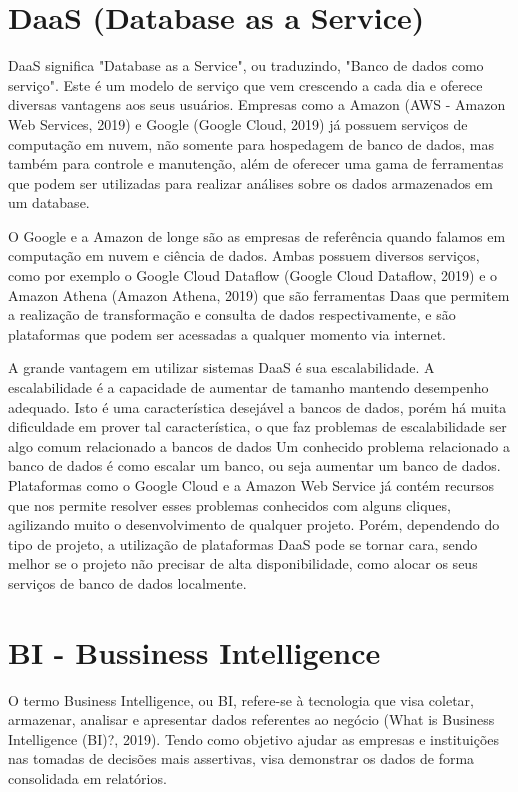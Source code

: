 \documentclass[
	12pt,				%
	openright,			%
	oneside,			%
	a4paper,			%
	chapter=TITLE,		%
	section=TITLE,		%
	subsection=TITLE,	%
	subsubsection=TITLE,%
	english,			%
	brazil				%
	]{abntex2}
\theoremstyle{definition}
\begin{document}
\section{DaaS (Database as a Service)}
    
    DaaS significa "Database as a Service", ou traduzindo, "Banco de dados como serviço". Este é um modelo de serviço que vem crescendo a cada dia e oferece diversas vantagens aos seus usuários. Empresas como a Amazon (AWS - Amazon Web Services, 2019) e Google (Google Cloud, 2019) já possuem serviços de computação em nuvem, não somente para hospedagem de banco de dados, mas também para controle e manutenção, além de oferecer uma gama de ferramentas que podem ser utilizadas para realizar análises sobre os dados armazenados em um database.

    O Google e a Amazon de longe são as empresas de referência quando falamos em computação em nuvem e ciência de dados. Ambas possuem diversos serviços, como por exemplo o Google Cloud Dataflow (Google Cloud Dataflow, 2019) e o Amazon Athena (Amazon Athena, 2019) que são ferramentas Daas que permitem a realização de transformação e consulta de dados respectivamente, e são plataformas que podem ser acessadas a qualquer momento via internet.
    
    A grande vantagem em utilizar sistemas DaaS é sua escalabilidade. A escalabilidade é a capacidade de aumentar de tamanho mantendo desempenho adequado. Isto é uma característica desejável a bancos de dados, porém há muita dificuldade em prover tal característica, o que faz problemas de escalabilidade ser algo comum relacionado a bancos de dados
    Um conhecido problema relacionado a banco de dados é como escalar um banco, ou seja aumentar um banco de dados. Plataformas como o Google Cloud e a Amazon Web Service já contém recursos que nos permite resolver esses problemas conhecidos com alguns cliques, agilizando muito o desenvolvimento de qualquer projeto. Porém, dependendo do tipo de projeto, a utilização de plataformas DaaS pode se tornar cara, sendo melhor se o projeto não precisar de alta disponibilidade, como alocar os seus serviços de banco de dados localmente.
    
\section{BI - Bussiness Intelligence}

    O termo Business Intelligence, ou BI, refere-se à tecnologia que visa coletar, armazenar, analisar e apresentar dados referentes ao negócio (What is Business Intelligence (BI)?, 2019). Tendo como objetivo ajudar as empresas e instituições nas tomadas de decisões mais assertivas, visa demonstrar os dados de forma consolidada em relatórios.
    
\end{document}
